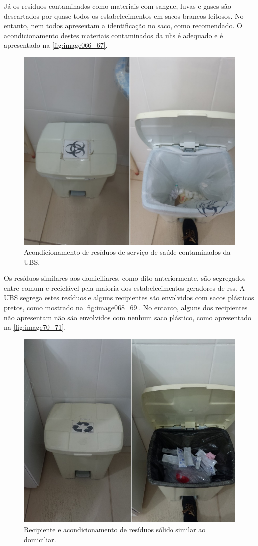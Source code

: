 	
	Já os resíduos contaminados como materiais com sangue, luvas e gases são descartados por quase todos os estabelecimentos em sacos brancos leitosos. No entanto, nem todos apresentam a identificação no saco, como recomendado. O acondicionamento destes materiais contaminados da \gls{ubs} é adequado e é apresentado na \autoref{fig:image066_67}.
	
	\begin{figure}
		\centering
		\includegraphics[width=0.75\linewidth]{produtos/prodtres/image066_67}
		\caption{Acondicionamento de resíduos de serviço de saúde contaminados da UBS.}
		\label{fig:image066_67}
	\end{figure}
	
	
	Os resíduos similares aos domiciliares, como dito anteriormente, são segregados entre comum e reciclável pela maioria dos estabelecimentos geradores de \gls{rss}. A UBS segrega estes resíduos e alguns recipientes são envolvidos com sacos plásticos pretos, como mostrado na \autoref{fig:image068_69}. No entanto, alguns dos recipientes não apresentam não são envolvidos com nenhum saco plástico, como apresentado na \autoref{fig:image70_71}.
	
	\begin{figure}
		\centering
		\includegraphics[width=0.75\linewidth]{produtos/prodtres/image068_69}
		\caption{Recipiente e acondicionamento de resíduos sólido similar ao domiciliar.}
		\label{fig:image068_69}
	\end{figure}
	
